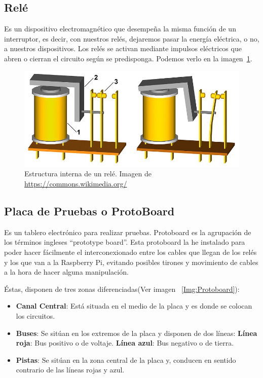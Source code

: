 \subsection{Relé}
Es un dispositivo electromagnético que desempeña la misma función de un interruptor, es decir, con nuestros relés, dejaremos pasar la energía eléctrica, o no, a nuestros dispositivos. Los relés se activan mediante impulsos eléctricos que abren o cierran el circuito según se predisponga. Podemos verlo en la imagen~\ref{Img:Rele1}.
\begin{figure}
    \centering
    \includegraphics[width=\textwidth]{img/Rele_1.jpg}
    \caption[Estructura interna de un relé]{Estructura interna de un relé. Imagen de \url{https://commons.wikimedia.org/}\cite{manual:GNU}} \label{Img:Rele1}
\end{figure}

\subsection{Placa de Pruebas o ProtoBoard}
Es un tablero electrónico para realizar pruebas. Protoboard es la agrupación de los términos ingleses “prototype board”.
Esta protoboard la he instalado para poder hacer fácilmente el interconexionado entre los cables que llegan de los relés y los que van a la Raspberry Pi, evitando posibles tirones y movimiento de cables a la hora de hacer alguna manipulación.

Éstas, disponen de tres zonas diferenciadas(Ver imagen ~\ref{Img:Protoboard}):

\begin{itemize}
    \item \textbf{Canal Central}: Está situada en el medio de la placa y es donde se colocan los circuitos.
    \item \textbf{Buses}: Se sitúan en los extremos de la placa y disponen de dos líneas:
        \subitem \textbf{Línea roja}: Bus positivo o de voltaje.
        \subitem \textbf{Línea azul}: Bus negativo o de tierra.
    \item \textbf{Pistas}: Se sitúan en la zona central de la placa y, conducen en sentido contrario de las líneas rojas y azul.
\end{itemize}

